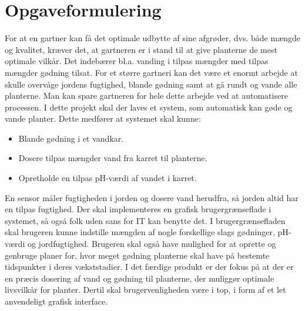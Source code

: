 \chapter{Opgaveformulering}
For at en gartner kan få det optimale udbytte af sine afgrøder, dvs. både mængde og kvalitet, kræver det, at gartneren er i stand til at give planterne de mest optimale vilkår. Det indebærer bl.a. vanding i tilpas mængder med tilpas mængder gødning tilsat. For et større gartneri kan det være et enormt arbejde at skulle overvåge jordens fugtighed, blande gødning samt at gå rundt og vande alle planterne. Man kan spare gartneren for hele dette arbejde ved at automatisere processen.
\newline
\newline
I dette projekt skal der laves et system, som automatisk kan gøde og vande planter. Dette medfører at systemet skal kunne:
\begin{itemize}
\item Blande gødning i et vandkar.
\item Dosere tilpas mængder vand fra karret til planterne.
\item Opretholde en tilpas pH-værdi af vandet i karret.
\end{itemize}

En sensor måler fugtigheden i jorden og dosere vand herudfra, så jorden altid har en tilpas fugtighed.
\newline
\newline
Der skal implementeres en grafisk brugergrænseflade i systemet, så også folk uden sans for IT kan benytte det. I brugergrænsefladen skal brugeren kunne indstille mængden af nogle forskellige slags gødninger, pH-værdi og jordfugtighed. Brugeren skal også have mulighed for at oprette og genbruge planer for, hvor meget gødning planterne skal have på bestemte tidspunkter i deres vækststadier.
\newline
\newline
I det færdige produkt er der fokus på at der er en præcis dosering af vand og gødning til planterne, der muliggør optimale livsvilkår for planter. Dertil skal brugervenligheden være i top, i form af et let anvendeligt grafisk interface.